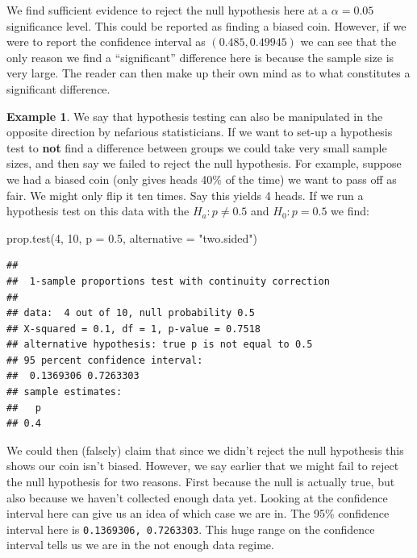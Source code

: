 \documentclass[
]{book}
\newenvironment{Shaded}{\begin{snugshade}}{\end{snugshade}}
\newcommand{\AttributeTok}[1]{\textcolor[rgb]{0.77,0.63,0.00}{#1}}
\newcommand{\DecValTok}[1]{\textcolor[rgb]{0.00,0.00,0.81}{#1}}
\newcommand{\FloatTok}[1]{\textcolor[rgb]{0.00,0.00,0.81}{#1}}
\newcommand{\FunctionTok}[1]{\textcolor[rgb]{0.00,0.00,0.00}{#1}}
\newcommand{\NormalTok}[1]{#1}
\newcommand{\StringTok}[1]{\textcolor[rgb]{0.31,0.60,0.02}{#1}}
\theoremstyle{definition}
\theoremstyle{definition}
\newtheorem{example}{Example}[chapter]
\theoremstyle{definition}
\theoremstyle{definition}
\theoremstyle{remark}
\begin{document}
We find sufficient evidence to reject the null hypothesis here at a \(\alpha=0.05\) significance level. This could be reported as finding a biased coin. However, if we were to report the confidence interval as \((0.485,0.49945)\) we can see that the only reason we find a ``significant'' difference here is because the sample size is very large. The reader can then make up their own mind as to what constitutes a significant difference.

\begin{example}
\protect\hypertarget{exm:unnamed-chunk-576}{}\label{exm:unnamed-chunk-576}We say that hypothesis testing can also be manipulated in the opposite direction by nefarious statisticians. If we want to set-up a hypothesis test to \textbf{not} find a difference between groups we could take very small sample sizes, and then say we failed to reject the null hypothesis. For example, suppose we had a biased coin (only gives heads 40\% of the time) we want to pass off as fair. We might only flip it ten times. Say this yields 4 heads. If we run a hypothesis test on this data with the \(H_a: p \neq 0.5\) and \(H_0: p=0.5\) we find:
\end{example}

\begin{Shaded}
\begin{Highlighting}[]
\FunctionTok{prop.test}\NormalTok{(}\DecValTok{4}\NormalTok{, }\DecValTok{10}\NormalTok{, }\AttributeTok{p =} \FloatTok{0.5}\NormalTok{, }\AttributeTok{alternative =} \StringTok{"two.sided"}\NormalTok{)}
\end{Highlighting}
\end{Shaded}

\begin{verbatim}
## 
##  1-sample proportions test with continuity correction
## 
## data:  4 out of 10, null probability 0.5
## X-squared = 0.1, df = 1, p-value = 0.7518
## alternative hypothesis: true p is not equal to 0.5
## 95 percent confidence interval:
##  0.1369306 0.7263303
## sample estimates:
##   p 
## 0.4
\end{verbatim}

We could then (falsely) claim that since we didn't reject the null hypothesis this shows our coin isn't biased. However, we say earlier that we might fail to reject the null hypothesis for two reasons. First because the null is actually true, but also because we haven't collected enough data yet. Looking at the confidence interval here can give us an idea of which case we are in. The 95\% confidence interval here is \texttt{0.1369306,\ 0.7263303}. This huge range on the confidence interval tells us we are in the not enough data regime.
\end{document}

